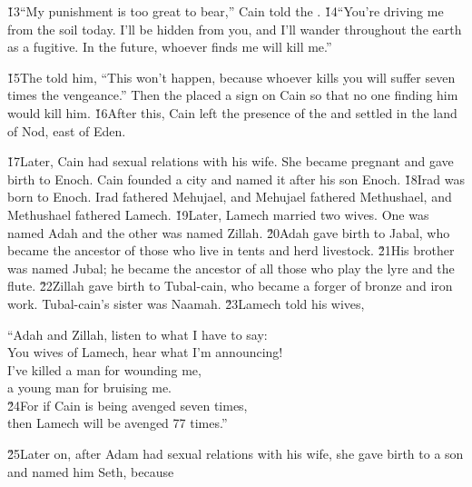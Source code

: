 \v{13}``My punishment is too great to bear,'' Cain told the . \v{14}``You're driving me from the soil today. I'll be hidden from you, and I'll wander throughout the earth as a fugitive. In the future, whoever finds me will kill me.''

\v{15}The  told him, ``This won't happen, because whoever kills you will suffer seven times the vengeance.'' Then the  placed a sign on Cain so that no one finding him would kill him. \v{16}After this, Cain left the presence of the  and settled in the land of Nod, east of Eden.

\v{17}Later, Cain had sexual relations with his wife. She became pregnant and gave birth to Enoch. Cain founded a city and named it after his son Enoch. \v{18}Irad was born to Enoch. Irad fathered Mehujael, and Mehujael fathered Methushael, and Methushael fathered Lamech. \v{19}Later, Lamech married two wives. One was named Adah and the other was named Zillah. \v{20}Adah gave birth to Jabal, who became the ancestor of those who live in tents and herd livestock. \v{21}His brother was named Jubal; he became the ancestor of all those who play the lyre and the flute. \v{22}Zillah gave birth to Tubal-cain, who became a forger of bronze and iron work. Tubal-cain's sister was Naamah. \v{23}Lamech told his wives,

\begin{poetry}
\poeml ``Adah and Zillah, listen to what I have to say: \\
\poemll    You wives of Lamech, hear what I'm announcing! \\
\poeml I've killed a man for wounding me, \\
\poemll    a young man for bruising me. \\
\poeml \v{24}For if Cain is being avenged seven times, \\
\poemll    then Lamech will be avenged 77 times.''
\end{poetry}

\v{25}Later on, after Adam had sexual relations with his wife, she gave birth to a son and named him Seth, because


